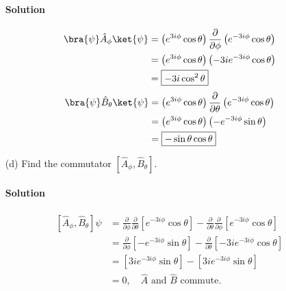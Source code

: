 \documentclass{article}
\begin{document}
\begin{enumerate}
		\paragraph{Solution}
		\begin{align*}
			\bra{\psi}\hat{A}_\phi\ket{\psi} &= \left( e^{3i\phi} \cos \theta \right) \frac{\partial}{\partial \phi} \left( e^{-3i\phi} \cos \theta \right) \\
			&= \left( e^{3i\phi} \cos \theta \right) \left( -3ie^{-3i\phi} \cos \theta \right) \\
			&= \boxed{-3i \cos^2 \theta}
		\end{align*}
		\begin{align*}
			\bra{\psi}\hat{B}_\theta\ket{\psi} &= \left( e^{3i\phi} \cos \theta \right) \frac{\partial}{\partial \theta} \left( e^{-3i\phi} \cos \theta \right) \\
			&= \left( e^{3i\phi} \cos \theta \right) \left( -e^{-3i\phi} \sin \theta \right) \\
			&= \boxed{-\sin \theta \cos \theta}
		\end{align*}
		
		\item[(d)] Find the commutator $ \left[ \hat{A}_\phi, \hat{B}_\theta \right] $.
		\paragraph{Solution} 
		\begin{align*}
			\left[ \hat{A}_\phi, \hat{B}_\theta \right]\psi &= \frac{\partial}{\partial \phi} \frac{\partial}{\partial \theta} \left[ e^{-3i\phi} \cos \theta \right] - \frac{\partial}{\partial \theta} \frac{\partial}{\partial \phi} \left[ e^{-3i\phi} \cos \theta \right] \\
			&= \frac{\partial}{\partial \phi} \left[ -e^{-3i\phi} \sin \theta \right] - \frac{\partial}{\partial \theta} \left[ -3i e^{-3i\phi} \cos \theta \right] \\
			&= \left[ 3ie^{-3i\phi} \sin \theta \right] - \left[ 3i e^{-3i\phi} \sin \theta \right] \\
			&= \boxed{0, \quad \hat{A} \text{ and } \hat{B} \text{ commute.}}
		\end{align*}
		
		
	\end{enumerate}
	
	
	
\end{document}
